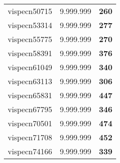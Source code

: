 \begin{tabular}{cc||c}
vispecn50715     & 9.999.999        & {\bf 260}       \\ 
vispecn53314     & 9.999.999        & {\bf 277}       \\ 
vispecn55775     & 9.999.999        & {\bf 270}       \\ 
vispecn58391     & 9.999.999        & {\bf 376}       \\ 
vispecn61049     & 9.999.999        & {\bf 340}       \\ 
vispecn63113     & 9.999.999        & {\bf 306}       \\ 
vispecn65831     & 9.999.999        & {\bf 447}       \\ 
vispecn67795     & 9.999.999        & {\bf 346}       \\ 
vispecn70501     & 9.999.999        & {\bf 474}       \\ 
vispecn71708     & 9.999.999        & {\bf 452}       \\ 
vispecn74166     & 9.999.999        & {\bf 339}       \\ 
\end{tabular}